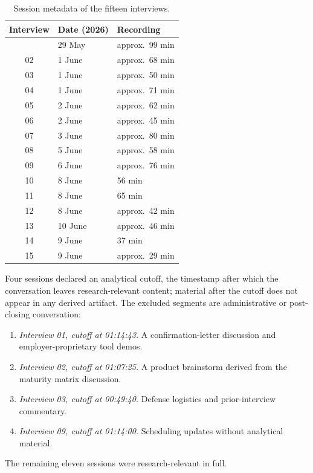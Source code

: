 \begin{longtable}{c l l}
\caption{Session metadata of the fifteen interviews.}
\label{tab:interviews-metadata}\\
\toprule
\textbf{Interview} & \textbf{Date (2026)} & \textbf{Recording} \\
\midrule
\endhead
\bottomrule
\endfoot
01 & 29 May & approx.\ 99 min \\
02 & 1 June & approx.\ 68 min \\
03 & 1 June & approx.\ 50 min \\
04 & 1 June & approx.\ 71 min \\
05 & 2 June & approx.\ 62 min \\
06 & 2 June & approx.\ 45 min \\
07 & 3 June & approx.\ 80 min \\
08 & 5 June & approx.\ 58 min \\
09 & 6 June & approx.\ 76 min \\
10 & 8 June & 56 min \\
11 & 8 June & 65 min \\
12 & 8 June & approx.\ 42 min \\
13 & 10 June & approx.\ 46 min \\
14 & 9 June & 37 min \\
15 & 9 June & approx.\ 29 min \\
\end{longtable}

Four sessions declared an analytical cutoff, the timestamp after which the conversation leaves research-relevant content; material after the cutoff does not appear in any derived artifact. The excluded segments are administrative or post-closing conversation:

\begin{enumerate}[itemsep=8pt,topsep=2pt]
  \item \emph{Interview 01, cutoff at 01:14:43.} A confirmation-letter discussion and employer-proprietary tool demos.
  \item \emph{Interview 02, cutoff at 01:07:25.} A product brainstorm derived from the maturity matrix discussion.
  \item \emph{Interview 03, cutoff at 00:49:40.} Defense logistics and prior-interview commentary.
  \item \emph{Interview 09, cutoff at 01:14:00.} Scheduling updates without analytical material.
\end{enumerate}

The remaining eleven sessions were research-relevant in full.

